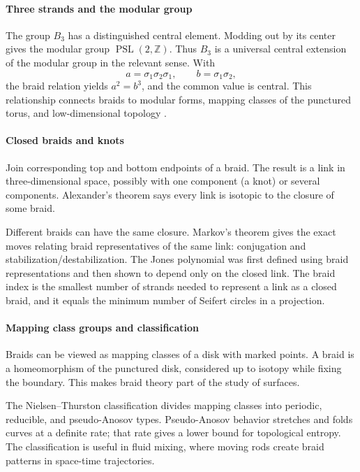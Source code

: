 \paragraph{Three strands and the modular group}

The group $B_3$ has a distinguished central element. Modding out by its center gives the modular group $\operatorname{PSL}(2,\mathbb Z)$. Thus $B_3$ is a universal central extension of the modular group in the relevant sense. With
\[
 a=\sigma_1\sigma_2\sigma_1,\qquad b=\sigma_1\sigma_2,
\]
the braid relation yields $a^2=b^3$, and the common value is central. This relationship connects braids to modular forms, mapping classes of the punctured torus, and low-dimensional topology \cite{braid_theory_ref2,braid_theory_ref5}.

\paragraph{Closed braids and knots}

Join corresponding top and bottom endpoints of a braid. The result is a link in three-dimensional space, possibly with one component (a knot) or several components. Alexander's theorem says every link is isotopic to the closure of some braid.

Different braids can have the same closure. Markov's theorem gives the exact moves relating braid representatives of the same link: conjugation and stabilization/destabilization. The Jones polynomial was first defined using braid representations and then shown to depend only on the closed link. The braid index is the smallest number of strands needed to represent a link as a closed braid, and it equals the minimum number of Seifert circles in a projection.

\paragraph{Mapping class groups and classification}

Braids can be viewed as mapping classes of a disk with marked points. A braid is a homeomorphism of the punctured disk, considered up to isotopy while fixing the boundary. This makes braid theory part of the study of surfaces.

The Nielsen--Thurston classification divides mapping classes into periodic, reducible, and pseudo-Anosov types. Pseudo-Anosov behavior stretches and folds curves at a definite rate; that rate gives a lower bound for topological entropy. The classification is useful in fluid mixing, where moving rods create braid patterns in space-time trajectories.

